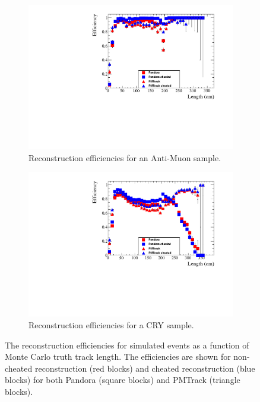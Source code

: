 \begin{figure}[h!]
  \centering
  \begin{subfigure}{0.45\textwidth}
    \centering
    \includegraphics[width=\textwidth]{Effic_AntiMuon_500V_All_Length}
    \caption{Reconstruction efficiencies for an Anti-Muon sample.}
    \label{fig:SimEffic_Length_AMu}
  \end{subfigure}
  \hspace{0.08\textwidth}
  \begin{subfigure}{0.45\textwidth}
    \centering
    \includegraphics[width=\textwidth]{Effic_Cosmics_500V_All_Length}
    \caption{Reconstruction efficiencies for a CRY sample.}
    \label{fig:SimEffic_Length_CRY}
  \end{subfigure}
  \caption[The reconstruction efficiencies for simulated events as a function of Monte Carlo truth track length.]
          {The reconstruction efficiencies for simulated events as a function of Monte Carlo truth track length. The efficiencies are shown for non-cheated reconstruction (red blocks) and cheated reconstruction (blue blocks) for both Pandora (square blocks) and PMTrack (triangle blocks).}
          \label{fig:SimEffic_Length}
\end{figure}

